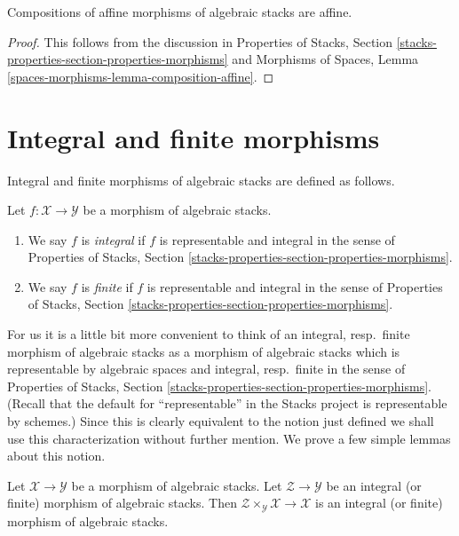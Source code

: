 \begin{lemma}
\label{lemma-composition-affine}
Compositions of affine morphisms of algebraic stacks are affine.
\end{lemma}

\begin{proof}
This follows from the discussion in
Properties of Stacks, Section
\ref{stacks-properties-section-properties-morphisms}
and
Morphisms of Spaces, Lemma \ref{spaces-morphisms-lemma-composition-affine}.
\end{proof}





\section{Integral and finite morphisms}
\label{section-integral}

\noindent
Integral and finite morphisms of algebraic stacks are defined as follows.

\begin{definition}
\label{definition-integral}
Let $f : \mathcal{X} \to \mathcal{Y}$ be a morphism of algebraic stacks.
\begin{enumerate}
\item We say $f$ is {\it integral} if $f$ is representable and integral
in the sense of Properties of Stacks, Section
\ref{stacks-properties-section-properties-morphisms}.
\item We say $f$ is {\it finite} if $f$ is representable and integral
in the sense of Properties of Stacks, Section
\ref{stacks-properties-section-properties-morphisms}.
\end{enumerate}
\end{definition}

\noindent
For us it is a little bit more convenient to think of an
integral, resp.\ finite morphism of algebraic stacks as a
morphism of algebraic stacks which is
representable by algebraic spaces and integral, resp.\ finite
in the sense of Properties of Stacks, Section
\ref{stacks-properties-section-properties-morphisms}.
(Recall that the default for ``representable'' in the Stacks project
is representable by schemes.)
Since this is clearly equivalent to the notion just defined we shall
use this characterization without further mention.
We prove a few simple lemmas about this notion.

\begin{lemma}
\label{lemma-base-change-integral}
Let $\mathcal{X} \to \mathcal{Y}$ be a morphism of algebraic stacks.
Let $\mathcal{Z} \to \mathcal{Y}$ be an integral (or finite)
morphism of algebraic stacks. Then
$\mathcal{Z} \times_\mathcal{Y} \mathcal{X} \to \mathcal{X}$
is an integral (or finite) morphism of algebraic stacks.
\end{lemma}

